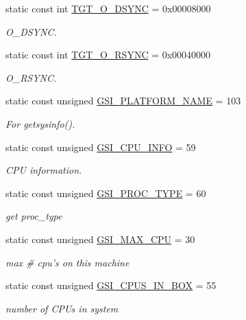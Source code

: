 \begin{Indent}{\bf }
\begin{DoxyCompactItemize}
static const int \hyperlink{classMipsLinux_ac8d84ac6abb2d868443e4559bed55ebe}{TGT\_\-O\_\-DSYNC} = 0x00008000
\begin{DoxyCompactList}\small\item\em O\_\-DSYNC. \item\end{DoxyCompactList}\item 
static const int \hyperlink{classMipsLinux_a1b4245158ffbfdc36ae7d6e666ffc261}{TGT\_\-O\_\-RSYNC} = 0x00040000
\begin{DoxyCompactList}\small\item\em O\_\-RSYNC. \item\end{DoxyCompactList}\item 
static const unsigned \hyperlink{classMipsLinux_ac2412600f242b3062b887ef0ec4b4908}{GSI\_\-PLATFORM\_\-NAME} = 103
\begin{DoxyCompactList}\small\item\em For getsysinfo(). \item\end{DoxyCompactList}\item 
static const unsigned \hyperlink{classMipsLinux_ad89f91e0925845385f177d93e4ef7985}{GSI\_\-CPU\_\-INFO} = 59
\begin{DoxyCompactList}\small\item\em CPU information. \item\end{DoxyCompactList}\item 
static const unsigned \hyperlink{classMipsLinux_a3048b7c97d8a7e86854cdb73520560d0}{GSI\_\-PROC\_\-TYPE} = 60
\begin{DoxyCompactList}\small\item\em get proc\_\-type \item\end{DoxyCompactList}\item 
static const unsigned \hyperlink{classMipsLinux_a14ed8f49156face38fb0dee35125148d}{GSI\_\-MAX\_\-CPU} = 30
\begin{DoxyCompactList}\small\item\em max \# cpu's on this machine \item\end{DoxyCompactList}\item 
static const unsigned \hyperlink{classMipsLinux_a4df912c77419619f6f242873f65b0045}{GSI\_\-CPUS\_\-IN\_\-BOX} = 55
\begin{DoxyCompactList}\small\item\em number of CPUs in system \item\end{DoxyCompactList}\item 

\end{DoxyCompactItemize}
\end{Indent}
